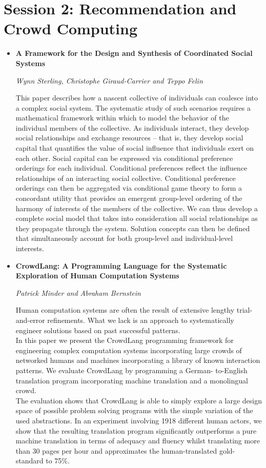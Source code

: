 \section{Session 2: Recommendation and Crowd Computing}
\begin{itemize}
\item \textbf{A Framework for the Design and Synthesis of Coordinated Social
Systems}

\textit{Wynn Sterling, Christophe Giraud-Carrier and Teppo Felin}

This paper describes how a nascent collective of individuals can coalesce into a
complex social system. The systematic study of such scenarios requires a
mathematical framework within which to model the behavior of the individual
members of the collective. As individuals interact, they develop social
relationships and exchange resources -- that is, they develop social capital
that quantifies the value of social influence that individuals exert on each
other. Social capital can be expressed via conditional preference orderings for
each individual. Conditional preferences reflect the influence relationships of
an interacting social collective. Conditional preference orderings can then be
aggregated via conditional game theory to form a concordant utility that
provides an emergent group-level ordering of the harmony of interests of the
members of the collective. We can thus develop a complete social model that
takes into consideration all social relationships as they propagate through the
system. Solution concepts can then be defined that simultaneously account for
both group-level and individual-level interests.

\item \textbf{CrowdLang: A Programming Language for the Systematic Exploration
of Human Computation Systems}

\textit{Patrick Minder and Abraham Bernstein}

Human computation systems are often the result of extensive lengthy
trial-and-error refinements. What we lack is an approach to systematically
engineer solutions based on past successful patterns.\\
In this paper we present the CrowdLang programming framework for engineering
complex computation systems incorporating large crowds of networked humans and
machines incorporating a library of known interaction patterns. We evaluate
CrowdLang by programming a German- to-English translation program incorporating
machine translation and a monolingual crowd.\\
The evaluation shows that CrowdLang is able to simply explore a large design
space of possible problem solving programs with the simple variation of the used
abstractions. In an experiment involving 1918 different human actors, we show
that the resulting translation program significantly outperforms a pure machine
translation in terms of adequacy and fluency whilst translating more than 30
pages per hour and approximates the human-translated gold-standard to 75\%.



\end{itemize}
